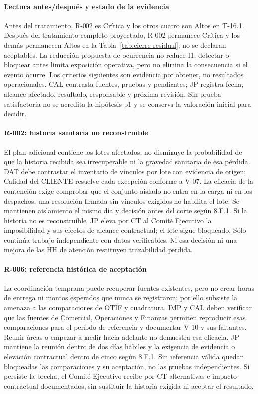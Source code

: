 \paragraph{Lectura antes/después y estado de la evidencia}
Antes del tratamiento, R-002 es Crítica y los otros cuatro son Altos en T-16.1.
Después del tratamiento completo proyectado, R-002 permanece Crítica y los demás
permanecen Altos en la Tabla~\ref{tab:cierre-residual}; no se declaran aceptables.
La reducción propuesta de ocurrencia no reduce I1: detectar o bloquear antes
limita exposición operativa, pero no elimina la consecuencia si el evento ocurre.
Los criterios siguientes son evidencia por obtener, no resultados operacionales.
CAL contrasta fuentes, pruebas y pendientes; JP registra fecha, alcance afectado,
resultado, responsable y próxima revisión. Sin prueba satisfactoria no se acredita
la hipótesis p1 y se conserva la valoración inicial para decidir.

\paragraph{R-002: historia sanitaria no reconstruible}
El plan adicional contiene los lotes afectados; no disminuye la probabilidad de
que la historia recibida sea irrecuperable ni la gravedad sanitaria de esa pérdida.
DAT debe contrastar el inventario de vínculos por lote con evidencia de origen;
Calidad del CLIENTE resuelve cada excepción conforme a V-07. La eficacia de la
contención exige comprobar que el conjunto aislado no entra en la carga ni en
los despachos; una resolución firmada sin vínculos exigidos no habilita el lote.
Se mantienen aislamiento el mismo día y decisión antes del corte según 8.F.1.
Si la historia no es reconstruible, JP eleva por CT al Comité Ejecutivo la
imposibilidad y sus efectos de alcance contractual; el lote sigue bloqueado.
Sólo continúa trabajo independiente con datos verificables. Ni esa decisión ni
una mejora de las HH de atención restituyen trazabilidad perdida.

\paragraph{R-006: referencia histórica de aceptación}
La coordinación temprana puede recuperar fuentes existentes, pero no crear horas
de entrega ni montos esperados que nunca se registraron; por ello subsiste la
amenaza a las comparaciones de OTIF y cuadratura. IMP y CAL deben verificar que
las fuentes de Comercial, Operaciones y Finanzas permiten reproducir esas
comparaciones para el período de referencia y documentar V-10 y sus faltantes.
Reunir áreas o empezar a medir hacia adelante no demuestra esa eficacia.
JP mantiene la reunión dentro de dos días hábiles y la exigencia de evidencia o
elevación contractual dentro de cinco según 8.F.1. Sin referencia válida quedan
bloqueadas las comparaciones y su aceptación, no las pruebas independientes.
Si persiste la brecha, el Comité Ejecutivo recibe por CT alternativas e impacto
contractual documentados, sin sustituir la historia exigida ni aceptar el resultado.

